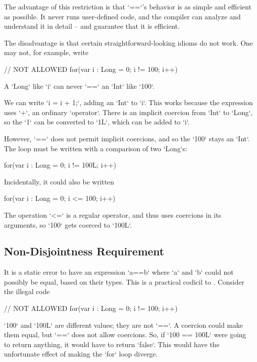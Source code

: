 The advantage of this restriction is that \xcd`==`'s behavior is as simple and
efficient as possible.  It never runs user-defined code, and the compiler can
analyze and understand it in detail -- and guarantee that it is efficient.

The disadvantage is that certain straightforward-looking idioms do not work.
One may not, for example, write
\begin{xten}
// NOT ALLOWED
for(var i : Long = 0; i != 100; i++) 
\end{xten}
A \xcd`Long` like \xcd`i` can never \xcd`==` an \xcd`Int` like \xcd`100`.

We can write \xcd`i = i + 1;`, adding an \xcd`Int` to \xcd`i`. This works 
because the expression uses \xcd`+`,  an ordinary \xcd`operator`.
There is an implicit coercion from \xcd`Int` to \xcd`Long`, so the
\xcd`1` can be converted to \xcd`1L`, which can be added to \xcd`i`.  

However, \xcd`==` does not permit implicit coercions, and so the \xcd`100`
stays an \xcd`Int`.  The loop must be written with a comparison of two
\xcd`Long`s: 
\begin{xten}
for(var i : Long = 0; i != 100L; i++) 
\end{xten}

Incidentally, it could also be written 
\begin{xten}
for(var i : Long = 0; i <= 100; i++) 
\end{xten}
The operation \xcd`<=` is a regular operator, and thus uses coercions in its
arguments, so \xcd`100` gets coerced to \xcd`100L`.  

\subsection{Non-Disjointness Requirement}

It is a static error to have an expression \xcd`a==b` where \xcd`a` and
\xcd`b` could not possibly be equal, based on their types.  This is a
practical codicil to .  Consider the illegal code 
\begin{xten}
// NOT ALLOWED
for(var i : Long = 0; i != 100; i++) 
\end{xten}

\xcd`100` and \xcd`100L` are different values; they are not \xcd`==`. A
coercion could make them equal, but \xcd`==` does not allow coercions. So, if
\xcd`100 == 100L` were going to return anything, it would have to return
\xcd`false`. This would have the unfortunate effect of making the \xcd`for`
loop diverge.

